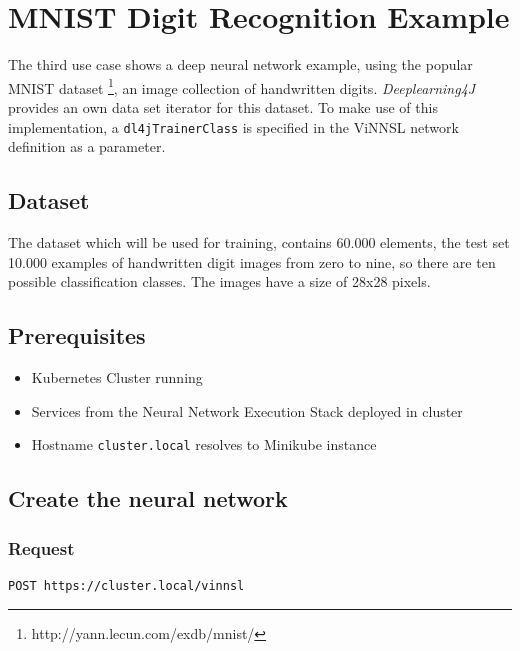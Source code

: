 \section{MNIST Digit Recognition
Example}\label{mnist-digit-recognition-example}

The third use case shows a deep neural network example, using the
popular MNIST dataset \footnote{http://yann.lecun.com/exdb/mnist/}, an
image collection of handwritten digits. \emph{Deeplearning4J} provides
an own data set iterator for this dataset. To make use of this
implementation, a \texttt{dl4jTrainerClass} is specified in the ViNNSL
network definition as a parameter.

\subsection{Dataset}\label{dataset-2}

The dataset which will be used for training, contains 60.000 elements,
the test set 10.000 examples of handwritten digit images from zero to
nine, so there are ten possible classification classes. The images have
a size of 28x28 pixels.

\subsection{Prerequisites}\label{prerequisites-6}

\begin{itemize}
\tightlist
\item
  Kubernetes Cluster running
\item
  Services from the Neural Network Execution Stack deployed in cluster
\item
  Hostname \texttt{cluster.local} resolves to Minikube instance
\end{itemize}

\subsection{Create the neural
network}\label{create-the-neural-network-2}

\subsubsection{Request}\label{request-6}

\begin{verbatim}
POST https://cluster.local/vinnsl
\end{verbatim}


